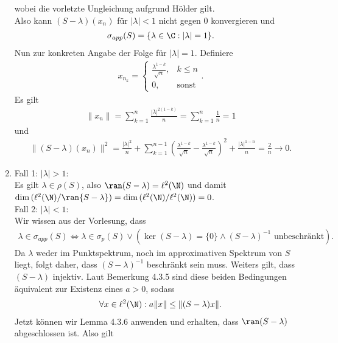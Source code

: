 \begin{solution}
\begin{enumerate}[label = (\alph*)]
  wobei die vorletzte Ungleichung aufgrund Hölder gilt. \\
  Also kann $(S - \lambda)(x_n)$ für $|\lambda| < 1$ nicht gegen $0$ konvergieren und
  \begin{align*}
    \sigma_{app}(S) = \{\lambda \in \C: |\lambda| = 1 \}.
  \end{align*}
  Nun zur konkreten Angabe der Folge für $|\lambda| = 1$. Definiere
  \begin{align*}
    x_{n_k} = \begin{cases}
      \frac{\lambda^{1-k}}{\sqrt{n}}, & k \leq n \\
      0, & \text{sonst}
    \end{cases}.
  \end{align*}
  Es gilt
  \begin{align*}
    \|x_n\| = \sum_{k=1}^n\frac{|\lambda|^{2(1-k)}}{n} = \sum_{k=1}^n\frac{1}{n} = 1
  \end{align*}
  und
  \begin{align*}
    \|(S - \lambda)(x_n)\|^2 = \frac{|\lambda|^2}{n} + \sum_{k = 1}^{n-1} \left(\frac{\lambda^{1-k}}{\sqrt{n}}-
    \frac{\lambda^{1-k}}{\sqrt{n}}\right)^2 +\frac{|\lambda|^{1-n}}{n} = \frac{2}{n} \to 0.
  \end{align*}
  \item Fall 1: $|\lambda| > 1$: \\
  Es gilt $\lambda \in \rho(S)$, also $\ran(S - \lambda) = \ell^2(\N)$ und damit
  $\dim{(\ell^2(\N) / \ran{S - \lambda})} = \dim{(\ell^2(\N) / \ell^2(\N))} = 0$. \\
  Fall 2: $|\lambda| < 1$: \\
  Wir wissen aus der Vorlesung, dass
  \begin{align*}
    \lambda \in \sigma_{app}(S) \iff \lambda \in \sigma_p(S) \lor (\ker(S - \lambda) = \{0\} \land (S - \lambda)^{-1} \text{ unbeschränkt}).
  \end{align*}
  Da $\lambda$ weder im Punktspektrum, noch im approximativen Spektrum von $S$ liegt,
  folgt daher, dass $(S - \lambda)^{-1}$ beschränkt sein muss. Weiters gilt, dass $(S - \lambda)$
  injektiv. Laut Bemerkung 4.3.5 sind diese beiden Bedingungen äquivalent zur Existenz eines $a > 0$, sodass
  \begin{align*}
    \forall x \in \ell^2(\N): a\|x\| \leq \|(S - \lambda)x\|.
  \end{align*}
  Jetzt können wir Lemma 4.3.6 anwenden und erhalten, dass $\ran(S - \lambda)$ abgeschlossen ist. Also gilt
  \begin{align*}

\end{align*}
\end{enumerate}
\end{solution}
